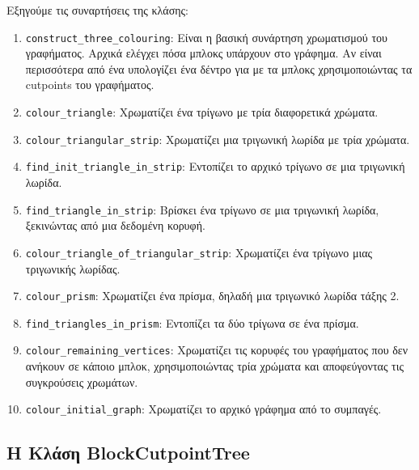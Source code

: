 Εξηγούμε τις συναρτήσεις της κλάσης:


\begin{enumerate}
	\item \texttt{construct\_three\_colouring}: Είναι η βασική συνάρτηση χρωματισμού του γραφήματος. Αρχικά ελέγχει πόσα μπλοκς υπάρχουν στο γράφημα. Αν είναι περισσότερα από ένα υπολογίζει ένα δέντρο για με τα μπλοκς χρησιμοποιώντας τα cutpoints του γραφήματος.
	
	\item \texttt{colour\_triangle}: Χρωματίζει ένα τρίγωνο με τρία διαφορετικά χρώματα.
	
	\item \texttt{colour\_triangular\_strip}: Χρωματίζει μια τριγωνική λωρίδα με τρία χρώματα.
	
	\item \texttt{find\_init\_triangle\_in\_strip}: Εντοπίζει το αρχικό τρίγωνο σε μια τριγωνική λωρίδα.
	
	\item \texttt{find\_triangle\_in\_strip}: Βρίσκει ένα τρίγωνο σε μια τριγωνική λωρίδα, ξεκινώντας από μια δεδομένη κορυφή.
	
	\item \texttt{colour\_triangle\_of\_triangular\_strip}: Χρωματίζει ένα τρίγωνο μιας τριγωνικής λωρίδας.
	
	\item \texttt{colour\_prism}: Χρωματίζει ένα πρίσμα, δηλαδή μια τριγωνικό λωρίδα τάξης 2.
	
	\item \texttt{find\_triangles\_in\_prism}: Εντοπίζει τα δύο τρίγωνα σε ένα πρίσμα.
	
	\item \texttt{colour\_remaining\_vertices}: Χρωματίζει τις κορυφές του γραφήματος που δεν ανήκουν σε κάποιο μπλοκ, χρησιμοποιώντας τρία χρώματα και αποφεύγοντας τις συγκρούσεις χρωμάτων.
	
	\item \texttt{colour\_initial\_graph}: Χρωματίζει το αρχικό γράφημα από το συμπαγές. 
		
\end{enumerate}

\subsection{H Kλάση BlockCutpointTree}



